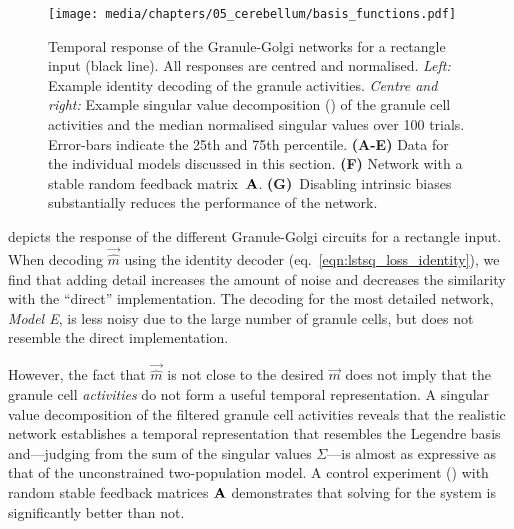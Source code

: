 \begin{figure}
	\centering
    \texttt{[image: media/chapters/05\_cerebellum/basis\_functions.pdf]}%
    {\label{fig:cerebellum_basis_functions_a}}%
    {\label{fig:cerebellum_basis_functions_b}}%
    {\label{fig:cerebellum_basis_functions_c}}%
    {\label{fig:cerebellum_basis_functions_d}}%
    {\label{fig:cerebellum_basis_functions_e}}%
    {\label{fig:cerebellum_basis_functions_f}}%
    {\label{fig:cerebellum_basis_functions_g}}%
    \vspace{0.5em}
    \caption[Temporal response of the Granule-Golgi networks]{
    	Temporal response of the Granule-Golgi networks for a rectangle input (black line).
    	All responses are centred and normalised.
    	\emph{Left:} Example identity decoding of the granule activities.
    	\emph{Centre and right:} Example singular value decomposition (\SVD) of the granule cell activities and the median normalised singular values over \num{100} trials. Error-bars indicate the 25th and 75th percentile.
    	\textbf{(A-E)} Data for the individual models discussed in this section.
    	\textbf{(F)} Network with a stable random feedback matrix~$\mathbf{A}$.
    	\textbf{(G)}~Disabling intrinsic biases substantially reduces the performance of the network.
    }
    \label{fig:cerebellum_basis_functions}
\end{figure}

 depicts the response of the different Granule-Golgi circuits for a rectangle input.
When decoding $\vec{\hat m}$ using the identity decoder (eq.~\ref{eqn:lstsq_loss_identity}), we find that adding detail increases the amount of noise and decreases the similarity with the \enquote{direct} implementation.
The decoding for the most detailed network, \emph{Model E}, is less noisy due to the large number of granule cells, but does not resemble the direct implementation.

However, the fact that $\vec{\hat m}$ is not close to the desired $\vec m$ does not imply that the granule cell \emph{activities} do not form a useful temporal representation.
A singular value decomposition of the filtered granule cell activities reveals that the realistic network establishes a temporal representation that resembles the Legendre basis and---judging from the sum of the singular values $\Sigma$---is almost as expressive as that of the unconstrained two-population model.
A control experiment () with random stable feedback matrices $\mathbf{A}$ demonstrates that solving for the \LDN system is significantly better than not.

